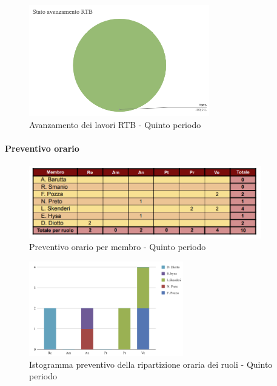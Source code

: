\pagebreak

\begin{figure}[H]
    \centering
    \begin{minipage}[b]{0.70\textwidth}
        \centering
        \includegraphics[width=0.7\textwidth]{../Images/torta5.png}
        \caption{Avanzamento dei lavori RTB - Quinto periodo}
        \label{fig:Avanzamento_RTB_5}
    \end{minipage}
\end{figure}

\paragraph{Preventivo orario}

\begin{figure}[H]
    \centering
    \includegraphics[width=0.9\textwidth]{../Images/tabPrev5.png}
    \caption{Preventivo orario per membro - Quinto periodo}
    \label{fig:Preventivo_orario_5}
\end{figure}

\vspace{0.6cm}

\begin{figure}[H] 
    \centering
    \includegraphics[width=0.6\textwidth]{../Images/graficoConsPrev5.png}
    \caption{Istogramma preventivo della ripartizione oraria dei ruoli - Quinto periodo}
    \label{fig:Preventivo_ripartizione_oraria_5}
\end{figure} 

